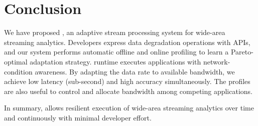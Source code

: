 \section{Conclusion}
\label{sec:conclusion}

We have proposed \sysname{}, an adaptive stream processing system for wide-area
streaming analytics. Developers express data degradation operations with
\maybe{} APIs, and our system performs automatic offline and online profiling to
learn a Pareto-optimal adaptation strategy. \sysname{} runtime executes
applications with network-condition awareness. By adapting the data rate to
available bandwidth, we achieve low latency (sub-second) and high accuracy
simultaneously. The profiles are also useful to control and allocate bandwidth
among competing applications.

In summary, \sysname{} allows resilient execution of wide-area streaming
analytics over time and continuously with minimal developer effort.

